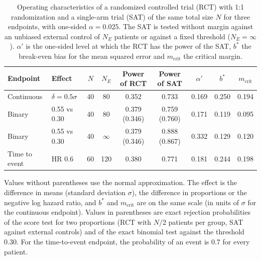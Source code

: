 \begin{table}[!htb]
\centering
\small
\setlength{\tabcolsep}{4pt}
\caption{Operating characteristics of a randomized controlled trial (RCT) with 1:1 randomization and a single-arm trial (SAT) of the same total size $N$ for three endpoints, with one-sided $\alpha = 0.025$. The SAT is tested without margin against an unbiased external control of $N_E$ patients or against a fixed threshold ($N_E = \infty$). $\alpha'$ is the one-sided level at which the RCT has the power of the SAT, $b^{*}$ the break-even bias for the mean squared error and $m_{\mathrm{crit}}$ the critical margin.}
\label{tab:illustration}
\begin{tabular}{llccccccc}
\toprule
Endpoint & Effect & $N$ & $N_E$ & Power of RCT & Power of SAT & $\alpha'$ & $b^{*}$ & $m_{\mathrm{crit}}$ \\
\midrule
Continuous & $\delta = 0.5\sigma$ & 40 & 80 & 0.352 & 0.733 & 0.169 & 0.250 & 0.194 \\
Binary & 0.55 vs 0.30 & 40 & 80 & 0.379 (0.346) & 0.759 (0.760) & 0.171 & 0.119 & 0.095 \\
Binary & 0.55 vs 0.30 & 40 & $\infty$ & 0.379 (0.346) & 0.888 (0.867) & 0.332 & 0.129 & 0.120 \\
Time to event & HR 0.6 & 60 & 120 & 0.380 & 0.771 & 0.181 & 0.244 & 0.198 \\
\bottomrule
\end{tabular}
\par\smallskip
\begin{minipage}{0.95\linewidth}
\footnotesize
Values without parentheses use the normal approximation. The effect is the difference in means (standard deviation $\sigma$), the difference in proportions or the negative log hazard ratio, and $b^{*}$ and $m_{\mathrm{crit}}$ are on the same scale (in units of $\sigma$ for the continuous endpoint). Values in parentheses are exact rejection probabilities of the score test for two proportions (RCT with $N/2$ patients per group, SAT against external controls) and of the exact binomial test against the threshold 0.30. For the time-to-event endpoint, the probability of an event is 0.7 for every patient.
\end{minipage}
\end{table}
